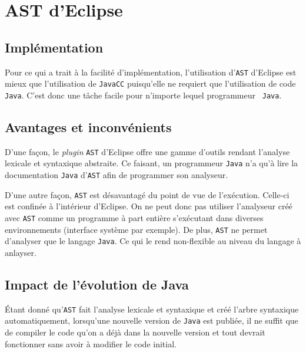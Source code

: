 \documentclass[11pt,french]{article}
\begin{document}
    \section{AST d'Eclipse} %
    \label{sec:ast-eclipse}
        \subsection{Implémentation} %
        \label{sub:implementation}
            Pour ce qui a trait à la facilité d'implémentation, l'utilisation d'{\tt AST} d'Eclipse
            est mieux que l'utilisation de {\tt JavaCC} puisqu'elle ne requiert que l'utilisation de
            code {\tt Java}. C'est donc une tâche facile pour n'importe lequel programmeur {\tt
            Java}.
        \subsection{Avantages et inconvénients} %
        \label{sub:avantages-inconvenients}
            D'une façon, le {\it plugin} {\tt AST} d'Eclipse offre une gamme d'outils rendant
            l'analyse lexicale et syntaxique abstraite. Ce faisant, un programmeur {\tt Java} n'a
            qu'à lire la documentation {\tt Java} d'{\tt AST} afin de programmer son analyseur.

            D'une autre façon, {\tt AST} est désavantagé du point de vue de l'exécution. Celle-ci
            est confinée à l'intérieur d'Eclipse. On ne peut donc pas utiliser l'analyseur créé avec
            {\tt AST} comme un programme à part entière s'exécutant dans diverses environnements
            (interface système par exemple). De plus, {\tt AST} ne permet d'analyser que le langage
            {\tt Java}. Ce qui le rend non-flexible au niveau du langage à anlayser.

        \subsection{Impact de l'évolution de Java} %
        \label{sub:impact-evolution-java}
            Étant donné qu'{\tt AST} fait l'analyse lexicale et syntaxique et créé l'arbre
            syntaxique automatiquement, lorsqu'une nouvelle version de {\tt Java} est publiée, il ne
            suffit que de compiler le code qu'on a déjà dans la nouvelle version et tout devrait
            fonctionner sans avoir à modifier le code initial.
\end{document}
